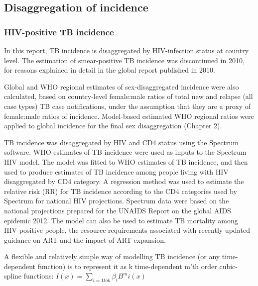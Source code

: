 \subsection{Disaggregation of incidence}
\subsubsection{HIV-positive TB incidence}

In this report, TB incidence is disaggregated by HIV-infection status at country level. The estimation of smear-positive TB incidence was discontinued in 2010, for reasons explained in detail in the global report published in 2010.

Global and WHO regional estimates of sex-disaggregated incidence were also calculated, based on country-level female:male ratios of total new and relapse (all case types) TB case notifications, under the assumption that they are a proxy of female:male ratios of incidence. Model-based estimated WHO regional ratios were applied to global incidence for the final sex disaggregation (Chapter 2).  

TB incidence was disaggregated by HIV and CD4 status using the Spectrum software\cite{Stover2012}. WHO estimates of TB incidence were used as inputs to the Spectrum HIV model. The model was fitted to WHO estimates of TB incidence, and then used to produce estimates of TB incidence among people living with HIV disaggregated by CD4 category. A regression method was used to estimate the relative risk (RR) for TB incidence according to the CD4 categories used by Spectrum for national HIV projections\cite{J2010}. Spectrum data were based on the national projections prepared for the UNAIDS Report on the global AIDS epidemic 2012. The model can also be used to  estimate TB mortality among HIV-positive people, the resource requirements associated with  recently updated guidance on ART and the impact of ART expansion. 

A flexible and relatively simple way of modelling TB incidence (or any time-dependent function) is to represent it as k time-dependent m’th order cubic-spline functions:
$I(x) = \sum_{i=1 to k} \beta_i B^m i(x)$
